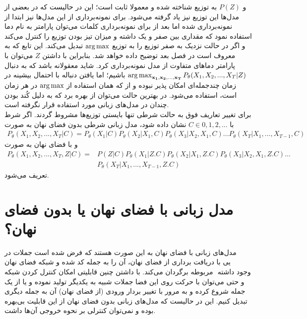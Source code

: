 و $P(Z)$ به توزیع
شناخته شده و معمولا ثابت است؛ این در حالیست که در بعضی از مدل‌ها این توزیع نیز یاد گرفته می‌شود. برای نمونه‌برداری از این مدل‌ها نیز ابتدا از \priordist{} نمونه‌برداری شده اما بعد از برای نمونه‌برداری کلمات می‌توان پارامتر به نام دما استفاده نمود که مقداری بین صفر و یک داشته و میزان تیز بودن توزیع را کنترل می‌کند و اگر در حالت نزدیک به صفر توزیع را به توزیع $\operatorname*{arg\,max}$ تبدیل می‌کند. این تابع که به  معروف است در فصل بعد توضیح داده خواهد شد. بنابراین با داشتن $Z$ می‌توان با پارامتر دما‌های متفاوت از مدل نمونه‌برداری کرد. شاید معقولانه باشد که به دنبال 
$\operatorname*{arg\,max}_{{\bf x_1}, {\bf x_2}, ..., {\bf x_T}} P_\theta(X_1, X_2, ... , X_T|Z)$
باشیم؛ اما یافتن دنباله با احتمال بیشینه در زمان چندجمله‌ای امکان پذیر نبوده و از \greedydecoding{} که همان استفاده از $\operatorname*{arg\,max}$ در هر زمان است، استفاده می‌شود. در بهترین حالت می‌توان از 
بهره برد که به دلیل کُند بودن چندان در مدل‌های زبانی مورد استفاده قرار نگرفته است.
\\
برای تغییر تعاریف فوق به حالت شرطی تنها بایستی توزیع‌ها مشروط گردند. اگر شرط با $C \in {0,1,2,...}$ نشان داده شود، مدل زبانی شرطی بدون فضای نهان به صورت 
\begin{align}
    P_\theta(X_1, X_2, ... , X_T|C) = P_\theta(X_1|C) P_\theta(X_2|X_1,C) P_\theta(X_3|X_2, X_1,C) ... P_\theta(X_T|X_1, ..., X_{T-1},C)
\end{align}
و با فضای نهان به صورت 
\begin{align}
P_\theta(X_1, X_2, ... , X_T,Z|C) =&P(Z|C) P_\theta(X_1|Z.C) P_\theta(X_2|X_1,Z.C) P_\theta(X_3|X_2, X_1,Z.C) ... \nonumber\\& P_\theta(X_T|X_1, ..., X_{T-1},Z.C)
\end{align}
تعریف می‌شود.
\section{مدل زبانی با فضای نهان یا بدون فضای نهان؟}
مدل‌های زبانی با فضای نهان به این صورت هستند که فرض شده است جملات در فضای نهان ‎کد شده و شبکه ‎\decoder یی با دریافت برداری از فضای نهان، آن را به جمله مربوطه برگردان می‌کند. با داشتن چنین قابلیتی امکان کنترل کردن شبکه ‎\decoder{}‎ وجود داشته و حتی می‌توان با حرکت روی این فضا جملات شبیه به یکدیگر تولید نموده و یا از یک جمله شروع کرده و به مرور با تغییر بردار ورودی (از فضای نهان) آن به جمله دیگری تبدیل کنیم. این در حالیست که مدل‌های زبانی بدون فضای نهان از این قابلیت بی‌بهره بوده و نمی‌توان کنترلی بر نحوه خروجی آن‌ها داشت.
